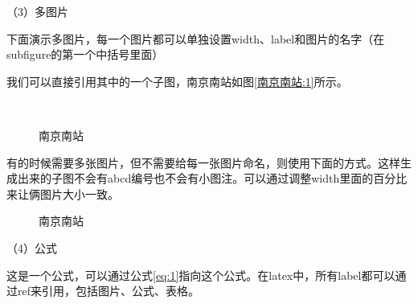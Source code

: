 \documentclass[bachelor]{njupthesis}
\begin{document}
\newpage %

（3）多图片

下面演示多图片，每一个图片都可以单独设置width、label和图片的名字（在subfigure的第一个中括号里面）

我们可以直接引用其中的一个子图，南京南站如图\ref{南京南站:1}所示。

\begin{figure}[hbt]
	\centering
	 \\
	\caption{南京南站}
	\label{南京南站}
\end{figure}

有的时候需要多张图片，但不需要给每一张图片命名，则使用下面的方式。这样生成出来的子图不会有abcd编号也不会有小图注。可以通过调整width里面的百分比来让俩图片大小一致。

\begin{figure}[hbt]
	\centering
	\caption{南京南站}
	\label{南京南站1}
\end{figure}

（4）公式

这是一个公式，可以通过公式\ref{eq:1}指向这个公式。在latex中，所有label都可以通过ref来引用，包括图片、公式、表格。
\end{document}
